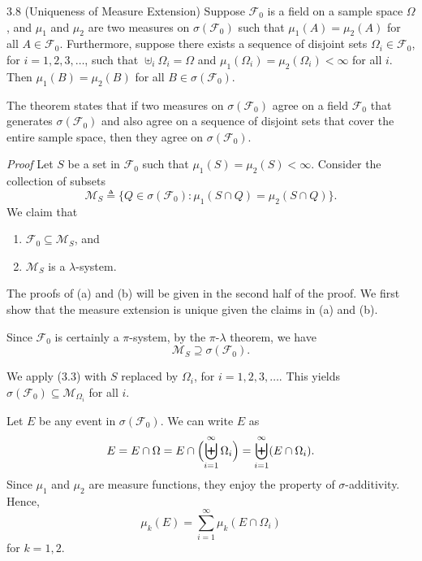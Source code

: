 \begin{thmbox}{3.8 (Uniqueness of Measure Extension)}
Suppose $\mathcal{F}_0$ is a field on a sample space $\Omega$, and $\mu_1$ and $\mu_2$ are two measures on $\sigma(\mathcal{F}_0)$ such that $\mu_1(A) = \mu_2(A)$ for all $A \in \mathcal{F}_0$. Furthermore, suppose there exists a sequence of disjoint sets $\Omega_i \in \mathcal{F}_0$, for $i = 1, 2, 3, \dots$, such that $\uplus_i \Omega_i = \Omega$ and $\mu_1(\Omega_i) = \mu_2(\Omega_i) < \infty$ for all $i$. Then $\mu_1(B) = \mu_2(B)$ for all $B \in \sigma(\mathcal{F}_0)$.
\end{thmbox}
The theorem states that if two measures on $\sigma(\mathcal{F}_0)$ agree on a field $\mathcal{F}_0$ that generates $\sigma(\mathcal{F}_0)$ and also agree on a sequence of disjoint sets that cover the entire sample space, then they agree on $\sigma(\mathcal{F}_0)$.

\noindent\textit{Proof} Let $S$ be a set in $\mathcal{F}_0$ such that $\mu_1(S) = \mu_2(S) < \infty$. Consider the collection of subsets
\[
\mathcal{M}_S \triangleq \{Q \in \sigma(\mathcal{F}_0) : \mu_1(S \cap Q) = \mu_2(S \cap Q)\}.
\]
We claim that
\begin{enumerate}[label=(\alph*)]
    \item $\mathcal{F}_0 \subseteq \mathcal{M}_S$, and
    \item $\mathcal{M}_S$ is a $\lambda$-system.
\end{enumerate}

The proofs of (a) and (b) will be given in the second half of the proof. We first show that the measure extension is unique given the claims in (a) and (b).

Since $\mathcal{F}_0$ is certainly a $\pi$-system, by the $\pi$-$\lambda$ theorem, we have
\begin{equation}
\mathcal{M}_S \supseteq \sigma(\mathcal{F}_0). \tag{3.3}
\end{equation}

We apply (3.3) with $S$ replaced by $\Omega_i$, for $i = 1, 2, 3, \dots$. This yields $\sigma(\mathcal{F}_0) \subseteq \mathcal{M}_{\Omega_i}$ for all $i$.

Let $E$ be any event in $\sigma(\mathcal{F}_0)$. We can write $E$ as
\[
E = E \cap \Omega = E \cap \Bigl( \biguplus_{i=1}^\infty \Omega_i \Bigr) = \biguplus_{i=1}^\infty (E \cap \Omega_i).
\]
Since $\mu_1$ and $\mu_2$ are measure functions, they enjoy the property of $\sigma$-additivity. Hence,
\[
\mu_k(E) = \sum_{i=1}^\infty \mu_k(E \cap \Omega_i)
\]
for $k = 1, 2$.

